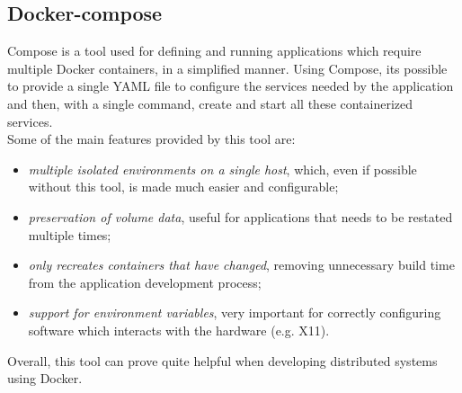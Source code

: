 \subsection{Docker-compose}\label{docker-compose}
Compose is a tool used for defining and running applications which require multiple Docker containers, in a simplified manner. Using Compose, its possible to provide a single YAML file to configure the services needed by the application and then, with a single command, create and start all these containerized services. \\
Some of the main features provided by this tool are:
\begin{itemize}
	\item \textit{multiple isolated environments on a single host}, which, even if possible without this tool, is made much easier and configurable;
	\item \textit{preservation of volume data}, useful for applications that needs to be restated multiple times;
	\item \textit{only recreates containers that have changed}, removing unnecessary build time from the application development process;
	\item \textit{support for environment variables}, very important for correctly configuring software which interacts with the hardware (e.g. X11).
\end{itemize}
Overall, this tool can prove quite helpful when developing distributed systems using Docker.

